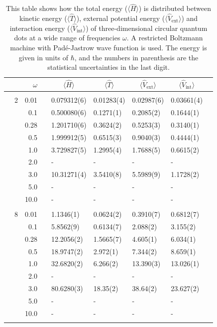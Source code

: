 \begin{table}
	\caption{This table shows how the total energy ($\langle\hat{H}\rangle$) is distributed between kinetic energy ($\langle\hat{T}\rangle$), external potential energy ($\langle\hat{V}_{\text{ext}}\rangle$) and interaction energy ($\langle\hat{V}_{\text{int}}\rangle$) of three-dimensional circular quantum dots at a wide range of frequencies $\omega$. A restricted Boltzmann machine with Padé-Jastrow wave function is used. The energy is given in units of $\hbar$, and the numbers in parenthesis are the statistical uncertainties in the last digit.}
	\label{tab:splitfrequencyQDRBMPJ3D}
	\begin{tabularx}{\textwidth}{R{1cm}rrcR{2.3cm}R{2.3cm}R{2.3cm}R{2.3cm}R{1cm}} \hline\hline
		&\makecell{\\ \phantom{$N$} \\ \phantom{=}} & $\omega$ &&  &  &  &  & \\ \hline \\
		&2 & 0.01 && 0.079312(6) & 0.01283(4) & 0.02987(6) & 0.03661(4) \\
		&& 0.1 && 0.500080(6) & 0.1271(1) & 0.2085(2) & 0.1644(1) \\
		&& 0.28 && 1.201710(6) & 0.3624(2) & 0.5253(3) & 0.3140(1) \\
		&& 0.5 && 1.999912(5) & 0.6515(3) & 0.9040(3) & 0.4444(1) \\
		&& 1.0 && 3.729827(5) & 1.2995(4) & 1.7688(5) & 0.6615(2) \\
		&& 2.0 && - & - & - & -\\
		&& 3.0 && 10.31271(4) & 3.5410(8) & 5.5989(9) & 1.1728(2) \\ 
		&& 5.0 && - & - & - & -\\
		&& 10.0 && - & - & - & -\\
		\hdashline \\
		
		&8 & 0.01 && 1.1346(1) & 0.0624(2) & 0.3910(7) & 0.6812(7) \\
		&& 0.1 && 5.8562(9) & 0.6134(7) & 2.088(2) & 3.155(2) \\
		&& 0.28 && 12.2056(2) & 1.5665(7) & 4.605(1) & 6.034(1) \\
		&& 0.5 && 18.9747(2) & 2.972(1) & 7.344(2) & 8.659(1) \\
		&& 1.0 && 32.6820(2) & 6.266(2) & 13.390(3) & 13.026(1) \\
		&& 2.0 && - & - & - & -\\
		&& 3.0 && 80.6280(3) & 18.35(2) & 38.64(2) & 23.627(2) \\ 
		&& 5.0 && - & - & - & -\\
		&& 10.0 && - & - & - & -\\
		\hdashline \\
		

\end{tabularx}
\end{table}
